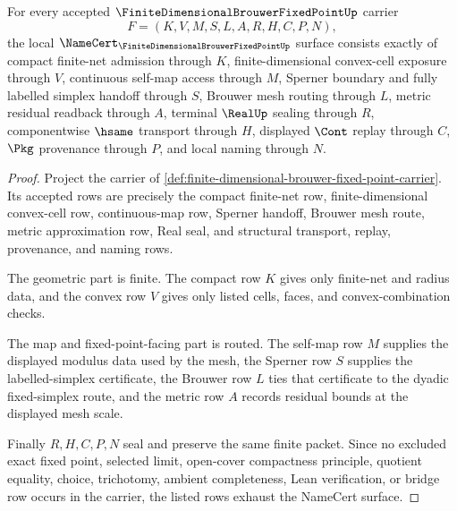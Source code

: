 \begin{theorem}
\label{thm:finite-dimensional-brouwer-fixed-point-namecert-obligations}
For every accepted $\FiniteDimensionalBrouwerFixedPointUp$ carrier
$$
F=(K,V,M,S,L,A,R,H,C,P,N),
$$
the local $\NameCert_{\FiniteDimensionalBrouwerFixedPointUp}$ surface consists exactly of compact finite-net admission through $K$, finite-dimensional convex-cell exposure through $V$, continuous self-map access through $M$, Sperner boundary and fully labelled simplex handoff through $S$, Brouwer mesh routing through $L$, metric residual readback through $A$, terminal $\RealUp$ sealing through $R$, componentwise $\hsame$ transport through $H$, displayed $\Cont$ replay through $C$, $\Pkg$ provenance through $P$, and local naming through $N$.
\end{theorem}
\begin{proof}
Project the carrier of \autoref{def:finite-dimensional-brouwer-fixed-point-carrier}. Its accepted rows are precisely the compact finite-net row, finite-dimensional convex-cell row, continuous-map row, Sperner handoff, Brouwer mesh route, metric approximation row, Real seal, and structural transport, replay, provenance, and naming rows.

The geometric part is finite. The compact row $K$ gives only finite-net and radius data, and the convex row $V$ gives only listed cells, faces, and convex-combination checks.

The map and fixed-point-facing part is routed. The self-map row $M$ supplies the displayed modulus data used by the mesh, the Sperner row $S$ supplies the labelled-simplex certificate, the Brouwer row $L$ ties that certificate to the dyadic fixed-simplex route, and the metric row $A$ records residual bounds at the displayed mesh scale.

Finally $R,H,C,P,N$ seal and preserve the same finite packet. Since no excluded exact fixed point, selected limit, open-cover compactness principle, quotient equality, choice, trichotomy, ambient completeness, Lean verification, or bridge row occurs in the carrier, the listed rows exhaust the NameCert surface.
\end{proof}

